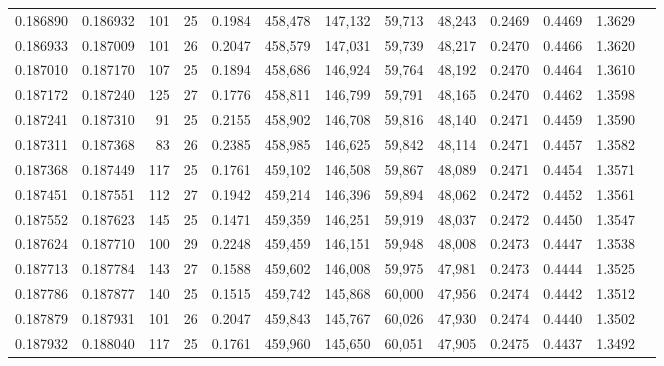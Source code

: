 \begin{tabular}{rrrrrrrrrrrrr}
0.186890 & 0.186932 & 101 &  25 &                                     0.1984 & 458,478 & 147,132 &  59,713 &  48,243 & 0.2469 & 0.4469 & 1.3629 \\
0.186933 & 0.187009 & 101 &  26 &                                     0.2047 & 458,579 & 147,031 &  59,739 &  48,217 & 0.2470 & 0.4466 & 1.3620 \\
0.187010 & 0.187170 & 107 &  25 &                                     0.1894 & 458,686 & 146,924 &  59,764 &  48,192 & 0.2470 & 0.4464 & 1.3610 \\
0.187172 & 0.187240 & 125 &  27 &                                     0.1776 & 458,811 & 146,799 &  59,791 &  48,165 & 0.2470 & 0.4462 & 1.3598 \\
0.187241 & 0.187310 &  91 &  25 &                                     0.2155 & 458,902 & 146,708 &  59,816 &  48,140 & 0.2471 & 0.4459 & 1.3590 \\
0.187311 & 0.187368 &  83 &  26 &                                     0.2385 & 458,985 & 146,625 &  59,842 &  48,114 & 0.2471 & 0.4457 & 1.3582 \\
0.187368 & 0.187449 & 117 &  25 &                                     0.1761 & 459,102 & 146,508 &  59,867 &  48,089 & 0.2471 & 0.4454 & 1.3571 \\
0.187451 & 0.187551 & 112 &  27 &                                     0.1942 & 459,214 & 146,396 &  59,894 &  48,062 & 0.2472 & 0.4452 & 1.3561 \\
0.187552 & 0.187623 & 145 &  25 &                                     0.1471 & 459,359 & 146,251 &  59,919 &  48,037 & 0.2472 & 0.4450 & 1.3547 \\
0.187624 & 0.187710 & 100 &  29 &                                     0.2248 & 459,459 & 146,151 &  59,948 &  48,008 & 0.2473 & 0.4447 & 1.3538 \\
0.187713 & 0.187784 & 143 &  27 &                                     0.1588 & 459,602 & 146,008 &  59,975 &  47,981 & 0.2473 & 0.4444 & 1.3525 \\
0.187786 & 0.187877 & 140 &  25 &                                     0.1515 & 459,742 & 145,868 &  60,000 &  47,956 & 0.2474 & 0.4442 & 1.3512 \\
0.187879 & 0.187931 & 101 &  26 &                                     0.2047 & 459,843 & 145,767 &  60,026 &  47,930 & 0.2474 & 0.4440 & 1.3502 \\
0.187932 & 0.188040 & 117 &  25 &                                     0.1761 & 459,960 & 145,650 &  60,051 &  47,905 & 0.2475 & 0.4437 & 1.3492 \\

\end{tabular}
